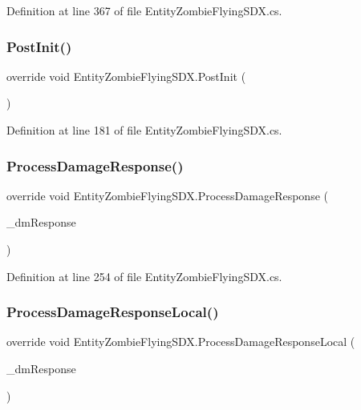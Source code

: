 Definition at line 367 of file Entity\+Zombie\+Flying\+S\+D\+X.\+cs.

\mbox{\label{class_entity_zombie_flying_s_d_x_a7b913eb34126bf74120ce2f575e15de0}} 
\subsubsection{\texorpdfstring{PostInit()}{PostInit()}}
{\footnotesize\ttfamily override void Entity\+Zombie\+Flying\+S\+D\+X.\+Post\+Init (\begin{DoxyParamCaption}{ }\end{DoxyParamCaption})}



Definition at line 181 of file Entity\+Zombie\+Flying\+S\+D\+X.\+cs.

\mbox{\label{class_entity_zombie_flying_s_d_x_ab11877193ed6025765e36bda39b0918a}} 
\subsubsection{\texorpdfstring{ProcessDamageResponse()}{ProcessDamageResponse()}}
{\footnotesize\ttfamily override void Entity\+Zombie\+Flying\+S\+D\+X.\+Process\+Damage\+Response (\begin{DoxyParamCaption}\item[{Damage\+Response}]{\+\_\+dm\+Response }\end{DoxyParamCaption})}



Definition at line 254 of file Entity\+Zombie\+Flying\+S\+D\+X.\+cs.

\mbox{\label{class_entity_zombie_flying_s_d_x_ab3e11a97fc12b099a0ceb479f17da7c7}} 
\subsubsection{\texorpdfstring{ProcessDamageResponseLocal()}{ProcessDamageResponseLocal()}}
{\footnotesize\ttfamily override void Entity\+Zombie\+Flying\+S\+D\+X.\+Process\+Damage\+Response\+Local (\begin{DoxyParamCaption}\item[{Damage\+Response}]{\+\_\+dm\+Response }\end{DoxyParamCaption})}



